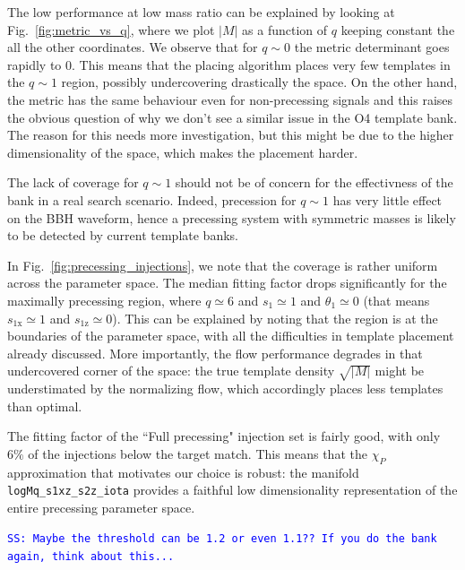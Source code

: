\documentclass[twocolumn,showpacs,preprintnumbers,nofootinbib,prd,
superscriptaddress,10pt]{revtex4-2}
\newcommand{\stefano}[1]{{\textcolor{blue}{\texttt{SS: #1}} }}
\begin{document}
The low performance at low mass ratio can be explained by looking at Fig.~\ref{fig:metric_vs_q}, where we plot $|M|$ as a function of $q$ keeping constant the all the other coordinates. We observe that for $q \sim 0$ the metric determinant goes rapidly to $0$. This means that the placing algorithm places very few templates in the $q\sim 1$ region, possibly undercovering drastically the space. On the other hand, the metric has the same behaviour even for non-precessing signals and this raises the obvious question of why we don't see a similar issue in the O4 template bank. The reason for this needs more investigation, but this might be due to the higher dimensionality of the space, which makes the placement harder.

The lack of coverage for $q\sim 1$ should not be of concern for the effectivness of the bank in a real search scenario. Indeed, precession for $q\sim 1$ has very little effect on the BBH waveform, hence a precessing system with symmetric masses is likely to be detected by current template banks.

In Fig.~\ref{fig:precessing_injections}, we note that the coverage is rather uniform across the parameter space. The median fitting factor drops significantly for the maximally precessing region, where $q \simeq 6$ and $s_1 \simeq 1$ and $\theta_1 \simeq 0$ (that means $s_\text{1x} \simeq 1$ and $s_\text{1z} \simeq 0$).
This can be explained by noting that the region is at the boundaries of the parameter space, with all the difficulties in template placement already discussed. More importantly, the flow performance degrades in that undercovered corner of the space: the true template density $\sqrt{|M|}$ might be understimated by the normalizing flow, which accordingly places less templates than optimal.

The fitting factor of the ``Full precessing" injection set is fairly good, with only $6\%$ of the injections below the target match. This means that the $\chi_P$ approximation that motivates our choice is robust: the manifold \texttt{logMq\_s1xz\_s2z\_iota} provides a faithful low dimensionality representation of the entire precessing parameter space.

\stefano{Maybe the threshold can be 1.2 or even 1.1?? If you do the bank again, think about this...}
\end{document}
